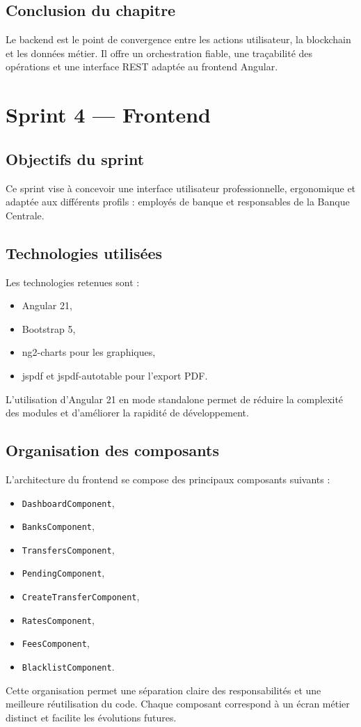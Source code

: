 \documentclass[a4paper,12pt]{report}
\begin{document}
\section{Conclusion du chapitre}
Le backend est le point de convergence entre les actions utilisateur, la blockchain et les données métier. Il offre un orchestration fiable, une traçabilité des opérations et une interface REST adaptée au frontend Angular.

\chapter{Sprint 4 --- Frontend}
\section{Objectifs du sprint}
Ce sprint vise à concevoir une interface utilisateur professionnelle, ergonomique et adaptée aux différents profils : employés de banque et responsables de la Banque Centrale.

\section{Technologies utilisées}
Les technologies retenues sont :
\begin{itemize}[leftmargin=*,nosep]
  \item Angular 21,
  \item Bootstrap 5,
  \item ng2-charts pour les graphiques,
  \item jspdf et jspdf-autotable pour l'export PDF.
\end{itemize}
L'utilisation d'Angular 21 en mode standalone permet de réduire la complexité des modules et d'améliorer la rapidité de développement.

\section{Organisation des composants}
L'architecture du frontend se compose des principaux composants suivants :
\begin{itemize}[leftmargin=*,nosep]
  \item \texttt{DashboardComponent},
  \item \texttt{BanksComponent},
  \item \texttt{TransfersComponent},
  \item \texttt{PendingComponent},
  \item \texttt{CreateTransferComponent},
  \item \texttt{RatesComponent},
  \item \texttt{FeesComponent},
  \item \texttt{BlacklistComponent}.
\end{itemize}
Cette organisation permet une séparation claire des responsabilités et une meilleure réutilisation du code. Chaque composant correspond à un écran métier distinct et facilite les évolutions futures.
\end{document}
